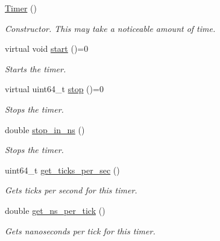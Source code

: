 \begin{DoxyCompactItemize}
\item 
\hypertarget{classxmem_1_1timers_1_1_timer_a5f16e8da27d2a5a5242dead46de05d97}{\hyperlink{classxmem_1_1timers_1_1_timer_a5f16e8da27d2a5a5242dead46de05d97}{Timer} ()}\label{classxmem_1_1timers_1_1_timer_a5f16e8da27d2a5a5242dead46de05d97}

\begin{DoxyCompactList}\small\item\em Constructor. This may take a noticeable amount of time. \end{DoxyCompactList}\item 
\hypertarget{classxmem_1_1timers_1_1_timer_af94a88fb78dd9edf299d4421e17f5fb3}{virtual void \hyperlink{classxmem_1_1timers_1_1_timer_af94a88fb78dd9edf299d4421e17f5fb3}{start} ()=0}\label{classxmem_1_1timers_1_1_timer_af94a88fb78dd9edf299d4421e17f5fb3}

\begin{DoxyCompactList}\small\item\em Starts the timer. \end{DoxyCompactList}\item 
virtual uint64\-\_\-t \hyperlink{classxmem_1_1timers_1_1_timer_a3be174c5eb733a2974ce76c146874e1f}{stop} ()=0
\begin{DoxyCompactList}\small\item\em Stops the timer. \end{DoxyCompactList}\item 
double \hyperlink{classxmem_1_1timers_1_1_timer_ae215ce438bb77e6c66aba6620f1e475a}{stop\-\_\-in\-\_\-ns} ()
\begin{DoxyCompactList}\small\item\em Stops the timer. \end{DoxyCompactList}\item 
uint64\-\_\-t \hyperlink{classxmem_1_1timers_1_1_timer_a86ec138f64ed24929ea12b08455fd0c0}{get\-\_\-ticks\-\_\-per\-\_\-sec} ()
\begin{DoxyCompactList}\small\item\em Gets ticks per second for this timer. \end{DoxyCompactList}\item 
double \hyperlink{classxmem_1_1timers_1_1_timer_a220f44f7372cc596141a4ddbd28fdf81}{get\-\_\-ns\-\_\-per\-\_\-tick} ()
\begin{DoxyCompactList}\small\item\em Gets nanoseconds per tick for this timer. \end{DoxyCompactList}\end{DoxyCompactItemize}
